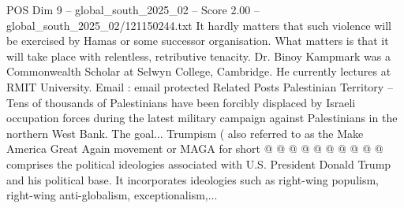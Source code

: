 \begin{textsample}{POS Dim 9 – global\_south\_2025\_02 – Score 2.00 – global\_south\_2025\_02/121150244.txt}
It hardly matters that such violence will be exercised by Hamas or some successor organisation.
What matters is that it will take place with relentless, retributive tenacity.
Dr.
Binoy Kampmark was a Commonwealth Scholar at Selwyn College, Cambridge.
He currently lectures at RMIT University.
Email : email protected Related Posts Palestinian Territory -- Tens of thousands of Palestinians have been forcibly displaced by Israeli occupation forces during the latest military campaign against Palestinians in the northern West Bank.
The goal...
Trumpism ( also referred to as the Make America Great Again movement or MAGA for short @ @ @ @ @ @ @ @ @ @ comprises the political ideologies associated with U.S.
President Donald Trump and his political base.
It incorporates ideologies such as right-wing populism, right-wing anti-globalism, exceptionalism,...

\end{textsample}
